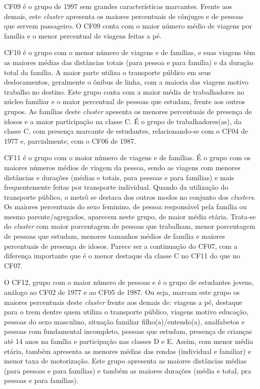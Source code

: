 CF09 é o grupo de 1997 sem grandes características marcantes.
Frente aos demais, este \textit{cluster} apresenta os maiores percentuais de cônjuges e de pessoas que servem passageiro. 
O CF09 conta com o maior número médio de viagens por família e o menor percentual de viagens feitas a pé.

CF10 é o grupo com o menor número de viagens e de famílias, e suas viagens têm as maiores médias das distâncias totais (para pessoa e para família) e da duração total da família.
A maior parte utiliza o transporte público em seus deslocamentos, geralmente o ônibus de linha, com a maioria das viagens motivo trabalho no destino.
Este grupo conta com a maior média de trabalhadores no núcleo familiar e o maior percentual de pessoas que estudam, frente aos outros grupos.
As famílias deste \textit{cluster} apesenta os menores percentuais de presença de idosos e a maior participação na classe C.
É o grupo de trabalhadores(as), da classe C, com presença marcante de estudantes, relacionando-se com o CF04 de 1977 e, parcialmente, com o CF06 de 1987.

CF11 é o grupo com o maior número de viagens e de famílias. 
É o grupo com os maiores números médios de viagem da pessoa, sendo as viagens com menores distâncias e durações (médias e totais, para pessoas e para famílias) e mais frequentemente feitas por transporte individual. 
Quando da utilização do transporte público, o metrô se destaca dos outros modos no conjunto dos \textit{clusters}.
Os maiores percentuais do sexo feminino, de pessoa responsável pela família ou mesmo parente/agregados, aparecem neste grupo, de maior média etária.
Trata-se do \textit{cluster} com maior porcentagem de pessoas que trabalham, menor porcentagem de pessoas que estudam, menores tamanhos médios de família e maiores percentuais de presença de idosos.
Parece ser a continuação do CF07, com a diferença importante que é o menor destaque da classe C no CF11 do que no CF07.

O CF12, grupo com o maior número de pessoas e é o grupo de estudantes jovens, análogo ao CF02 de 1977 e ao CF05 de 1987.
Ou seja, marcam este grupo os maiores percentuais deste \textit{cluster} frente aos demais de: viagens a pé, destaque para o trem dentre quem utiliza o transporte público, viagens motivo educação, pessoas do sexo masculino, situação familiar filho(a)/entendo(a), analfabetos e pessoas com fundamental incompleto, pessoas que estudam, presença de crianças até 14 anos na família e participação nas classes D e E.
Assim, com menor média etária, também apresenta as menores médias das rendas (individual e familiar) e menor taxa de motorização. 
Este grupo apresenta as maiores distâncias médias (para pessoas e para famílias) e também as maiores durações (média e total, pra pessoas e para famílias).

